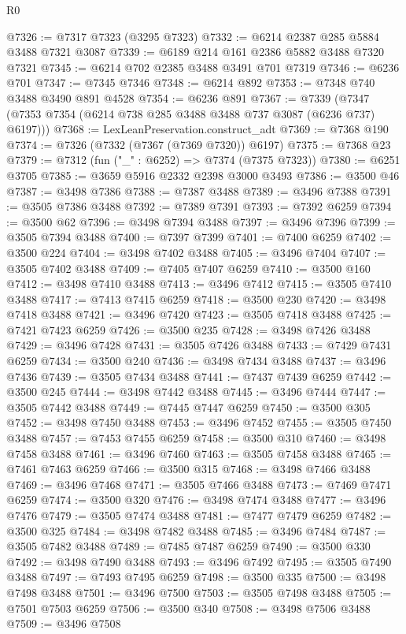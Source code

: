 \begin{lexlean}{R0}
\begin{coremodule}
@7326 := @7317 @7323 (@3295 @7323)
@7332 := @6214 @2387 @285 @5884 @3488 @7321 @3087
@7339 := @6189 @214 @161 @2386 @5882 @3488 @7320 @7321
@7345 := @6214 @702 @2385 @3488 @3491 @701 @7319
@7346 := @6236 @701
@7347 := @7345 @7346
@7348 := @6214 @892
@7353 := @7348 @740 @3488 @3490 @891 @4528
@7354 := @6236 @891
@7367 := @7339 (@7347 (@7353 @7354 (@6214 @738 @285 @3488 @3488 @737 @3087 (@6236 @737) @6197)))
@7368 := LexLeanPreservation.construct_adt
@7369 := @7368 @190
@7374 := @7326 (@7332 (@7367 (@7369 @7320)) @6197)
@7375 := @7368 @23
@7379 := @7312 (fun ("_" : @6252) => @7374 (@7375 @7323))
@7380 := @6251 @3705
@7385 := @3659 @5916 @2332 @2398 @3000 @3493
@7386 := @3500 @46
@7387 := @3498 @7386
@7388 := @7387 @3488
@7389 := @3496 @7388
@7391 := @3505 @7386 @3488
@7392 := @7389 @7391
@7393 := @7392 @6259
@7394 := @3500 @62
@7396 := @3498 @7394 @3488
@7397 := @3496 @7396
@7399 := @3505 @7394 @3488
@7400 := @7397 @7399
@7401 := @7400 @6259
@7402 := @3500 @224
@7404 := @3498 @7402 @3488
@7405 := @3496 @7404
@7407 := @3505 @7402 @3488
@7409 := @7405 @7407 @6259
@7410 := @3500 @160
@7412 := @3498 @7410 @3488
@7413 := @3496 @7412
@7415 := @3505 @7410 @3488
@7417 := @7413 @7415 @6259
@7418 := @3500 @230
@7420 := @3498 @7418 @3488
@7421 := @3496 @7420
@7423 := @3505 @7418 @3488
@7425 := @7421 @7423 @6259
@7426 := @3500 @235
@7428 := @3498 @7426 @3488
@7429 := @3496 @7428
@7431 := @3505 @7426 @3488
@7433 := @7429 @7431 @6259
@7434 := @3500 @240
@7436 := @3498 @7434 @3488
@7437 := @3496 @7436
@7439 := @3505 @7434 @3488
@7441 := @7437 @7439 @6259
@7442 := @3500 @245
@7444 := @3498 @7442 @3488
@7445 := @3496 @7444
@7447 := @3505 @7442 @3488
@7449 := @7445 @7447 @6259
@7450 := @3500 @305
@7452 := @3498 @7450 @3488
@7453 := @3496 @7452
@7455 := @3505 @7450 @3488
@7457 := @7453 @7455 @6259
@7458 := @3500 @310
@7460 := @3498 @7458 @3488
@7461 := @3496 @7460
@7463 := @3505 @7458 @3488
@7465 := @7461 @7463 @6259
@7466 := @3500 @315
@7468 := @3498 @7466 @3488
@7469 := @3496 @7468
@7471 := @3505 @7466 @3488
@7473 := @7469 @7471 @6259
@7474 := @3500 @320
@7476 := @3498 @7474 @3488
@7477 := @3496 @7476
@7479 := @3505 @7474 @3488
@7481 := @7477 @7479 @6259
@7482 := @3500 @325
@7484 := @3498 @7482 @3488
@7485 := @3496 @7484
@7487 := @3505 @7482 @3488
@7489 := @7485 @7487 @6259
@7490 := @3500 @330
@7492 := @3498 @7490 @3488
@7493 := @3496 @7492
@7495 := @3505 @7490 @3488
@7497 := @7493 @7495 @6259
@7498 := @3500 @335
@7500 := @3498 @7498 @3488
@7501 := @3496 @7500
@7503 := @3505 @7498 @3488
@7505 := @7501 @7503 @6259
@7506 := @3500 @340
@7508 := @3498 @7506 @3488
@7509 := @3496 @7508

\end{coremodule}
\end{lexlean}
